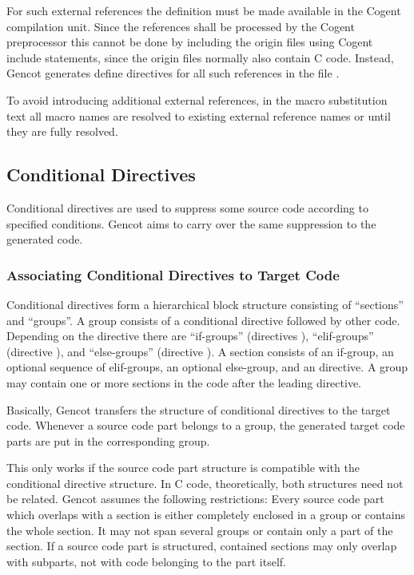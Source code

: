 For such external references the definition must be made available in the Cogent compilation unit. Since
the references shall be processed by the Cogent preprocessor this cannot be done by including the origin
files using Cogent include statements, since the origin files normally also contain C code. Instead,
Gencot generates define directives for all such references in the file .

To avoid introducing additional external references, in the macro substitution text all macro names are resolved to
existing external reference names or until they are fully resolved.

\subsection{Conditional Directives}

Conditional directives are used to suppress some source code according to specified conditions. Gencot aims to
carry over the same suppression to the generated code.

\subsubsection{Associating Conditional Directives to Target Code}

Conditional directives form a hierarchical block structure consisting of ``sections'' and ``groups''. A group
consists of a conditional directive followed by other code. Depending on the directive there are ``if-groups''
(directives ), ``elif-groups'' (directive ), and ``else-groups''
(directive ). A section consists of an if-group, an optional sequence of elif-groups, an optional
else-group, and an  directive. A group may contain one or more sections in the code after the
leading directive.

Basically, Gencot transfers the structure of conditional directives to the target code. Whenever a source code
part belongs to a group, the generated target code parts are put in the corresponding group. 

This only works if the source code part structure is compatible with the conditional directive structure.
In C code, theoretically, both structures need not be related. Gencot assumes the following restrictions:
Every source code part which overlaps with a section is either completely enclosed in a group or
contains the whole section. It may not span several groups or contain only a part of the section. If a
source code part is structured, contained sections may only overlap with subparts, not with code belonging
to the part itself. 


